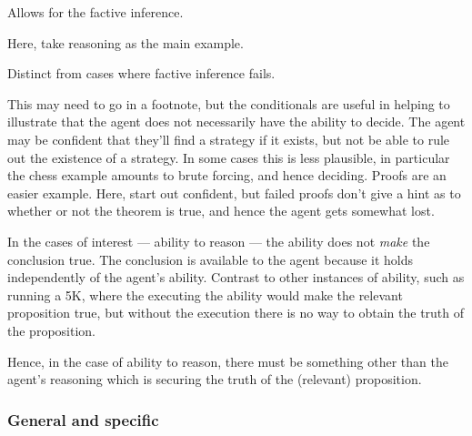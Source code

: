 \documentclass[10pt]{article}
\begin{document}
Allows for the factive inference.

Here, take reasoning as the main example.

Distinct from cases where factive inference fails.

\begin{note}
  This may need to go in a footnote, but the conditionals are useful in helping to illustrate that the agent does not necessarily have the ability to decide.
  The agent may be confident that they'll find a strategy if it exists, but not be able to rule out the existence of a strategy.
  In some cases this is less plausible, in particular the chess example amounts to brute forcing, and hence deciding.
  Proofs are an easier example.
  Here, start out confident, but failed proofs don't give a hint as to whether or not the theorem is true, and hence the agent gets somewhat lost.
\end{note}

\begin{note}
  In the cases of interest --- ability to reason --- the ability does not \emph{make} the conclusion true.
  The conclusion is available to the agent because it holds independently of the agent's ability.
  Contrast to other instances of ability, such as running a 5K, where the executing the ability would make the relevant proposition true, but without the execution there is no way to obtain the truth of the proposition.

  Hence, in the case of ability to reason, there must be something other than the agent's reasoning which is securing the truth of the (relevant) proposition.
\end{note}

\subsubsection{General and specific}
\label{sec:general-specific}
\end{document}
